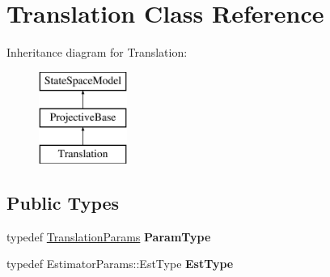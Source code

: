 \hypertarget{classTranslation}{\section{Translation Class Reference}
\label{classTranslation}
}
Inheritance diagram for Translation\-:\begin{figure}[H]
\begin{center}
\leavevmode
\includegraphics[height=3.000000cm]{classTranslation}
\end{center}
\end{figure}
\subsection*{Public Types}
\begin{DoxyCompactItemize}
\item 
\hypertarget{classTranslation_ab2e955d6ad9e3b277602ebdddaa4018d}{typedef \hyperlink{structTranslationParams}{Translation\-Params} {\bfseries Param\-Type}}\label{classTranslation_ab2e955d6ad9e3b277602ebdddaa4018d}

\item 
\hypertarget{classTranslation_ad0c33b52dd0bb240870847eea6e7339c}{typedef Estimator\-Params\-::\-Est\-Type {\bfseries Est\-Type}}\label{classTranslation_ad0c33b52dd0bb240870847eea6e7339c}

\end{DoxyCompactItemize}
